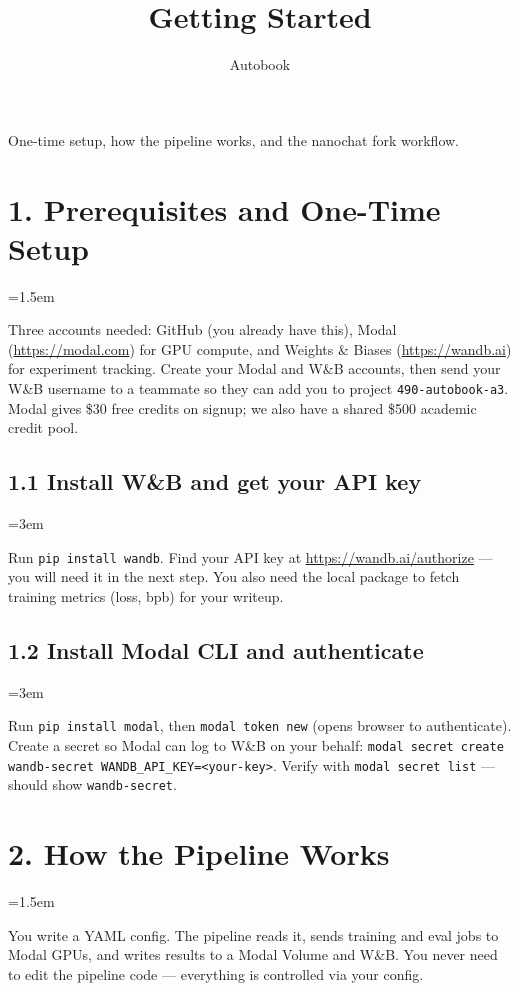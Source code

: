 \documentclass[9pt]{extarticle}
\title{\vspace{-1.2cm}\huge\textbf{Getting Started}\vspace{-0.5em}}
\author{\normalsize Autobook}
\date{\vspace{-1.5em}}
\newcommand{\cmd}[1]{\colorbox{gray!10}{\texttt{#1}}}
\begin{document}
\maketitle
\thispagestyle{fancy}

One-time setup, how the pipeline works, and the nanochat fork workflow.

\leftskip=0pt
\section*{1. Prerequisites and One-Time Setup}
\leftskip=1.5em

Three accounts needed: GitHub (you already have this), Modal (\url{https://modal.com}) for GPU compute, and Weights \& Biases (\url{https://wandb.ai}) for experiment tracking. Create your Modal and W\&B accounts, then send your W\&B username to a teammate so they can add you to project \texttt{490-autobook-a3}. Modal gives \$30 free credits on signup; we also have a shared \$500 academic credit pool.

\subsection*{1.1 Install W\&B and get your API key}
\leftskip=3em

Run \cmd{pip install wandb}. Find your API key at \url{https://wandb.ai/authorize} --- you will need it in the next step. You also need the local package to fetch training metrics (loss, bpb) for your writeup.

\subsection*{1.2 Install Modal CLI and authenticate}
\leftskip=3em

Run \cmd{pip install modal}, then \cmd{modal token new} (opens browser to authenticate). Create a secret so Modal can log to W\&B on your behalf: \cmd{modal secret create wandb-secret WANDB\_API\_KEY=<your-key>}. Verify with \cmd{modal secret list} --- should show \cmd{wandb-secret}.

\leftskip=0pt
\section*{2. How the Pipeline Works}
\leftskip=1.5em

You write a YAML config. The pipeline reads it, sends training and eval jobs to Modal GPUs, and writes results to a Modal Volume and W\&B. You never need to edit the pipeline code --- everything is controlled via your config.
\end{document}
